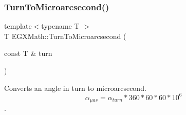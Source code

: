 \mbox{\label{group___e_g_x_math-_angle_conversions-_turn_ga41a861a04d65aab05647b32142e6d80d}} 
\subsubsection{\texorpdfstring{Turn\+To\+Microarcsecond()}{TurnToMicroarcsecond()}}
{\footnotesize\ttfamily template$<$typename T $>$ \\
T E\+G\+X\+Math\+::\+Turn\+To\+Microarcsecond (\begin{DoxyParamCaption}\item[{const T \&}]{turn }\end{DoxyParamCaption})}



Converts an angle in turn to microarcsecond. \[\alpha_{\mu as}=\alpha_{turn} * 360 * 60 * 60 * 10^6\]. 

